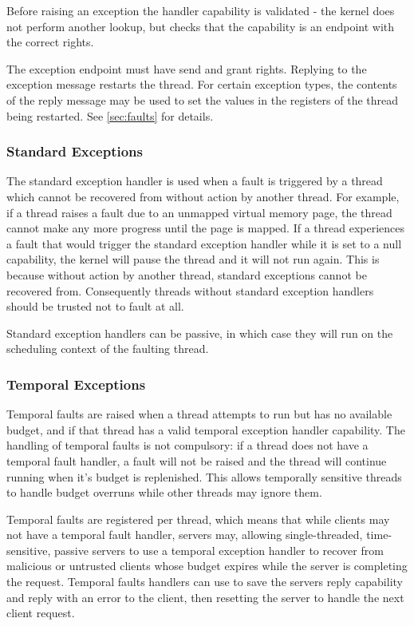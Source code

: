 Before raising an exception the handler capability is validated - the kernel does not perform another lookup, but checks that the capability is an endpoint with the correct rights.

The exception endpoint must have send and grant rights. Replying to the
exception message restarts the thread. For certain exception types, the contents of
the reply message may be used to set the values in the registers of the
thread being restarted.
See \autoref{sec:faults} for details.

\subsubsection{Standard Exceptions}

The standard exception handler is used when a fault is triggered by a thread which cannot be recovered from without action by another thread.
For example, if a thread raises a fault due to an unmapped virtual memory page, the thread cannot make any more progress until the page is mapped.
If a thread experiences a fault that would trigger the standard exception handler while it is set to a null capability, the kernel will pause the thread and it will not run again.
This is because without action by another thread, standard exceptions cannot be recovered from.
Consequently threads without standard exception handlers should be trusted not to fault at all.

Standard exception handlers can be passive, in which case they will run on the scheduling context of the faulting thread.

\subsubsection{Temporal Exceptions}
\label{sec:temporal-exceptions}

Temporal faults are raised when a thread attempts to run but has no available budget, and if that thread has a valid temporal exception handler capability.
The handling of temporal faults is not compulsory: if a thread does not have a temporal fault handler, a fault will not be raised and the thread will continue running when it's budget is replenished.
This allows temporally sensitive threads to handle budget overruns while other threads may ignore them.

Temporal faults are registered per thread, which means that while clients may not have a temporal fault handler, servers may, allowing single-threaded, time-sensitive, passive servers to use a temporal exception handler to recover from malicious or untrusted clients whose budget expires while the server is completing the request.
Temporal faults handlers can use  to save the servers reply capability and reply with an error to the client, then resetting the server to handle the next client request.

